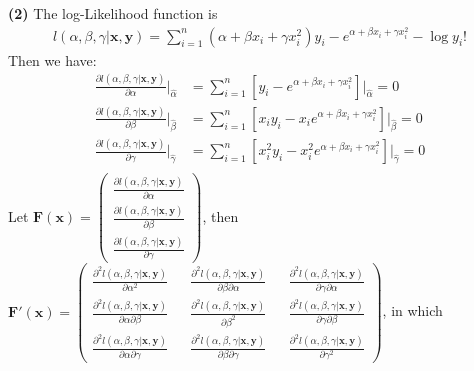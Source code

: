 \documentclass[11pt]{article}
\renewcommand\part[1]{\vspace{.10in}\textbf{(#1)}}
\begin{document}
\part{2} The log-Likelihood function is 
\begin{align*}
    l(\alpha, \beta, \gamma|\mathbf{x}, \mathbf{y}) = \sum_{i=1}^{n} (\alpha + \beta x_i + \gamma x_i^2)y_i - e^{\alpha + \beta x_i + \gamma x_i^2} - \log y_i !  
\end{align*}
Then we have:
\begin{align*}
    \frac{\partial l(\alpha, \beta, \gamma|\mathbf{x}, \mathbf{y})}{\partial \alpha}\bigg\rvert_{\hat{\alpha}} &= \sum_{i=1}^{n} [y_i - e^{\alpha + \beta x_i + \gamma x_i^2}]\bigg\rvert_{\hat{\alpha}} = 0\\
    \frac{\partial l(\alpha, \beta, \gamma|\mathbf{x}, \mathbf{y})}{\partial \beta}\bigg\rvert_{\hat{\beta}} &= \sum_{i=1}^{n} [x_iy_i - x_ie^{\alpha + \beta x_i + \gamma x_i^2}]\bigg\rvert_{\hat{\beta}} = 0\\
    \frac{\partial l(\alpha, \beta, \gamma|\mathbf{x}, \mathbf{y})}{\partial \gamma}\bigg\rvert_{\hat{\gamma}} &= \sum_{i=1}^{n} [x_i^2y_i - x_i^2e^{\alpha + \beta x_i + \gamma x_i^2}]\bigg\rvert_{\hat{\gamma}} = 0\\
\end{align*}
Let $\mathbf{F}(\mathbf{x}) = \begin{pmatrix}
    \frac{\partial l(\alpha, \beta, \gamma|\mathbf{x}, \mathbf{y})}{\partial \alpha}\\\frac{\partial l(\alpha, \beta, \gamma|\mathbf{x}, \mathbf{y})}{\partial \beta}\\\frac{\partial l(\alpha, \beta, \gamma|\mathbf{x}, \mathbf{y})}{\partial \gamma}
\end{pmatrix}$, then $\mathbf{F'}(\mathbf{x}) = \begin{pmatrix}
    \frac{\partial^2 l(\alpha, \beta, \gamma|\mathbf{x}, \mathbf{y})}{\partial \alpha^2} && \frac{\partial^2 l(\alpha, \beta, \gamma|\mathbf{x}, \mathbf{y})}{\partial \beta \partial \alpha} && \frac{\partial^2 l(\alpha, \beta, \gamma|\mathbf{x}, \mathbf{y})}{\partial \gamma \partial \alpha}\\
    \frac{\partial^2 l(\alpha, \beta, \gamma|\mathbf{x}, \mathbf{y})}{\partial \alpha \partial \beta} && \frac{\partial^2 l(\alpha, \beta, \gamma|\mathbf{x}, \mathbf{y})}{\partial \beta^2} && \frac{\partial^2 l(\alpha, \beta, \gamma|\mathbf{x}, \mathbf{y})}{\partial \gamma \partial \beta}\\
    \frac{\partial^2 l(\alpha, \beta, \gamma|\mathbf{x}, \mathbf{y})}{\partial \alpha \partial \gamma} && \frac{\partial^2 l(\alpha, \beta, \gamma|\mathbf{x}, \mathbf{y})}{\partial \beta \partial \gamma} && \frac{\partial^2 l(\alpha, \beta, \gamma|\mathbf{x}, \mathbf{y})}{\partial \gamma^2}
\end{pmatrix}$, in which 
\end{document}
